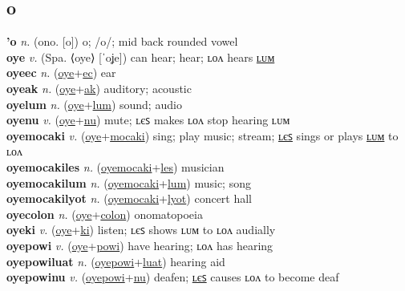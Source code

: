 \subsection{o}

\textbf{'o} \textit{n.} (ono. [o])
o; /o/; mid back rounded vowel \label{'o} \\
\textbf{oye} \textit{v.} (Spa. ⟨oye⟩ [ˈoʝe])
can hear; hear; ʟᴏᴧ hears \hyperref[oyelum]{ʟᴜᴍ} \label{oye} \\
\textbf{oyeec} \textit{n.} (\hyperref[oye]{oye}+\hyperref[ec]{ec})
ear \label{oyeec} \\
\textbf{oyeak} \textit{n.} (\hyperref[oye]{oye}+\hyperref[ak]{ak})
auditory; acoustic \label{oyeak} \\
\textbf{oyelum} \textit{n.} (\hyperref[oye]{oye}+\hyperref[lum]{lum})
sound; audio \label{oyelum} \\
\textbf{oyenu} \textit{v.} (\hyperref[oye]{oye}+\hyperref[nu]{nu})
mute; ʟєꜱ makes ʟᴏᴧ stop hearing ʟᴜᴍ \label{oyenu} \\
\textbf{oyemocaki} \textit{v.} (\hyperref[oye]{oye}+\hyperref[mocaki]{mocaki})
sing; play music; stream; \hyperref[oyemocakiles]{ʟєꜱ} sings or plays \hyperref[oyemocakilum]{ʟᴜᴍ} to ʟᴏᴧ \label{oyemocaki} \\
\textbf{oyemocakiles} \textit{n.} (\hyperref[oyemocaki]{oyemocaki}+\hyperref[les]{les})
musician \label{oyemocakiles} \\
\textbf{oyemocakilum} \textit{n.} (\hyperref[oyemocaki]{oyemocaki}+\hyperref[lum]{lum})
music; song \label{oyemocakilum} \\
\textbf{oyemocakilyot} \textit{n.} (\hyperref[oyemocaki]{oyemocaki}+\hyperref[lyot]{lyot})
concert hall \label{oyemocakilyot} \\
\textbf{oyecolon} \textit{n.} (\hyperref[oye]{oye}+\hyperref[colon]{colon})
onomatopoeia \label{oyecolon} \\
\textbf{oyeki} \textit{v.} (\hyperref[oye]{oye}+\hyperref[ki]{ki})
listen; ʟєꜱ shows ʟᴜᴍ to ʟᴏᴧ audially \label{oyeki} \\
\textbf{oyepowi} \textit{v.} (\hyperref[oye]{oye}+\hyperref[powi]{powi})
have hearing; ʟᴏᴧ has hearing \label{oyepowi} \\
\textbf{oyepowiluat} \textit{n.} (\hyperref[oyepowi]{oyepowi}+\hyperref[luat]{luat})
hearing aid \label{oyepowiluat} \\
\textbf{oyepowinu} \textit{v.} (\hyperref[oyepowi]{oyepowi}+\hyperref[nu]{nu})
deafen; \hyperref[oyepowinules]{ʟєꜱ} causes ʟᴏᴧ to become deaf \label{oyepowinu} \\
